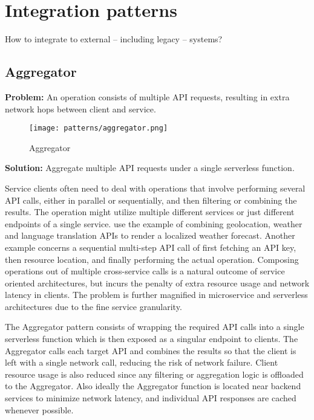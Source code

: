 \section{Integration patterns} \label{sec:integrationPatterns}

How to integrate to external -- including legacy -- systems?

\subsection{Aggregator} \label{subsec:aggregator}

\textbf{Problem:} An operation consists of multiple API requests, resulting in extra network hops between client and service.

\begin{figure}[h]
  \centering
  \texttt{[image: patterns/aggregator.png]}
  \caption{Aggregator}
  \label{fig:aggregator}
\end{figure}

\textbf{Solution:} Aggregate multiple API requests under a single serverless function.

Service clients often need to deal with operations that involve performing several API calls, either in parallel or sequentially, and then filtering or combining the results. The operation might utilize multiple different services or just different endpoints of a single service. \textcite{baldini17currentTrends} use the example of combining geolocation, weather and language translation APIs to render a localized weather forecast. Another example concerns a sequential multi-step API call of first fetching an API key, then resource location, and finally performing the actual operation. Composing operations out of multiple cross-service calls is a natural outcome of service oriented architectures, but incurs the penalty of extra resource usage and network latency in clients. The problem is further magnified in microservice and serverless architectures due to the fine service granularity. \parencite{microsoft18cloudPatterns}

The Aggregator pattern consists of wrapping the required API calls into a single serverless function which is then exposed as a singular endpoint to clients. The Aggregator calls each target API and combines the results so that the client is left with a single network call, reducing the risk of network failure. Client resource usage is also reduced since any filtering or aggregation logic is offloaded to the Aggregator. Also ideally the Aggregator function is located near backend services to minimize network latency, and individual API responses are cached whenever possible. \parencite{baldini17currentTrends}

